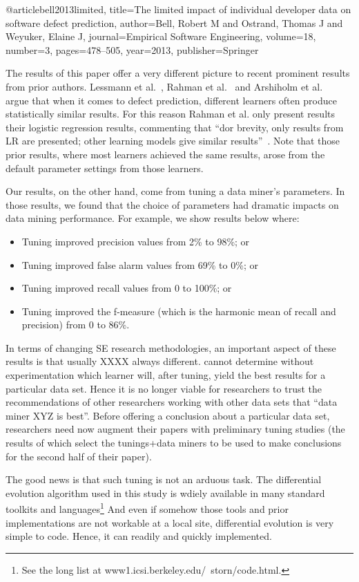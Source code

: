 \documentclass{sig-alternative}
\newcommand{\bi}{\begin{itemize}[leftmargin=0.4cm]}
\newcommand{\ei}{\end{itemize}}
\begin{document}
@article{bell2013limited,
  title={The limited impact of individual developer data on software defect prediction},
  author={Bell, Robert M and Ostrand, Thomas J and Weyuker, Elaine J},
  journal={Empirical Software Engineering},
  volume={18},
  number={3},
  pages={478--505},
  year={2013},
  publisher={Springer}
}

The results of this paper offer a very different picture  to recent prominent results from prior authors.
Lessmann et al.~\cite{lessmann2008benchmarking}, Rahman et al.~\cite{rahman2013how} and Arshiholm et al.~\cite{arisholm06} argue that when it comes to defect prediction, different learners often
produce statistically similar results. For this reason  Rahman et al. only present results their logistic
regression results, commenting that ``dor brevity, only results from LR are
presented; other learning models give similar results''~\cite{rahman2013how}. Note that those prior results,
where most learners achieved the same results, arose from the default parameter settings from those learners.

Our results, on the other hand, come from tuning a data miner's parameters. In those results,
we found that the choice of parameters had dramatic impacts on data mining performance.
For example, we show results below where:   
\bi 
\item 
Tuning improved precision values from  2\% to 98\%; or
\item 
Tuning improved false alarm values from 69\% to 0\%; or
\item 
Tuning improved recall values from 0 to 100\%; or
\item 
Tuning improved the f-measure (which is the harmonic mean of recall and precision) from 0 to 86\%.
\ei   
In terms of changing SE research methodologies, an important aspect of these results is that usually XXXX always different. cannot determine without experimentation which learner will, after tuning, yield the best results for a particular data set. Hence it is no longer viable for researchers to trust the recommendations 
of other researchers working with other data sets that ``data miner XYZ is best''. Before
offering a conclusion about a particular data set, researchers need now augment  their 
papers with preliminary tuning studies (the results of which select the tunings+data miners to be used
to make conclusions for the second half of their paper).

The good news is that such tuning is not an arduous task. The differential evolution algorithm 
used in this study is wdiely available in many standard  toolkits and languages\footnote{See the long list at
www1.icsi.berkeley.edu/~storn/code.html.}
And even if somehow those tools and prior implementations are not workable at a local site, 
differential evolution is very simple to code. Hence, it can readily and quickly implemented.
 
\end{document}
